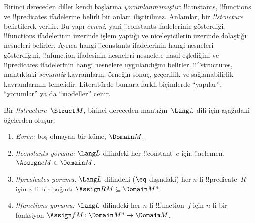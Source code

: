 



\begin{explain}
Birinci dereceden diller kendi başlarına \emph{yorumlanmamıştır}:
!!{constant}s, !!{function}s ve !!{predicate}s ifadelerine belirli bir
anlam iliştirilmez. Anlamlar, bir 
\emph{!!{structure}} belirtilerek verilir. Bu yapı \emph{evreni}, yani
!!{constant}s ifadelerinin gösterdiği, !!{function}s ifadelerinin
üzerinde işlem yaptığı ve niceleyicilerin üzerinde dolaştığı nesneleri
belirler. Ayrıca hangi !!{constant}s ifadelerinin hangi nesneleri
gösterdiğini, !!a{function} ifadesinin nesneleri nesnelere nasıl
eşlediğini ve !!{predicate}s ifadelerinin hangi nesnelere uygulandığını
belirler. !!^{structure}s, mantıktaki \emph{semantik} kavramların;
örneğin sonuç, geçerlilik ve sağlanabilirlik kavramlarının temelidir.
Literatürde bunlara farklı biçimlerde ``yapılar'', ``yorumlar'' ya da
``modeller'' denir.
\end{explain}

\begin{defn}[!!^{structure}s]
Bir  \emph{!!{structure}}~$\Struct M$, birinci
dereceden mantığın~$\Lang L$ dili için aşağıdaki öğelerden oluşur:
\begin{enumerate}
\item \emph{Evren:} boş olmayan bir küme, $\Domain M$.
\item \emph{!!{constant}s yorumu:} $\Lang L$ dilindeki her
  !!{constant}~$c$ için !!a{element}~$\Assign cM\in\Domain M$.
\item \emph{!!{predicate}s yorumu:} $\Lang L$ dilindeki ($\eq$
  dışındaki) her $n$-li !!{predicate}~$R$ için $n$-li bir bağıntı
  $\Assign RM\subseteq\Domain M^n$.
\item \emph{!!{function}s yorumu:} $\Lang L$ dilindeki her $n$-li
  !!{function}~$f$ için $n$-li bir fonksiyon
  $\Assign fM\colon\Domain M^n\to\Domain M$.
\end{enumerate}
\end{defn}


